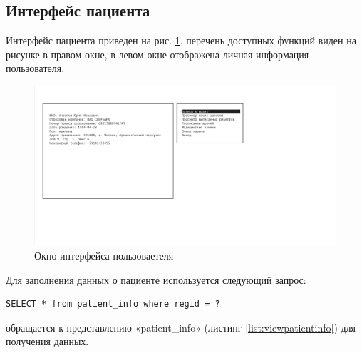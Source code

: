 \documentclass[14pt,a4paper,russian]{extreport}
\begin{document}
\subsection{Интерфейс пациента}
Интерфейс пациента приведен на рис. \ref{fig:patientint}, перечень доступных функций виден на рисунке в правом окне, в левом окне отображена личная информация пользователя.\par
\begin{figure}[h!]
        \includegraphics[width=\textwidth]{prog_int/patient-interface}
        \caption{Окно интерфейса пользоваетеля}
        \label{fig:patientint}
\end{figure}
Для заполнения данных о пациенте используется следующий запрос:
\begin{lstlisting}[style=csql] 
SELECT * from patient_info where regid = ?
\end{lstlisting}
 обращается к представлению «patient\_info» (листинг \ref{list:viewpatientinfo}) для получения данных.\par\par
\end{document}
